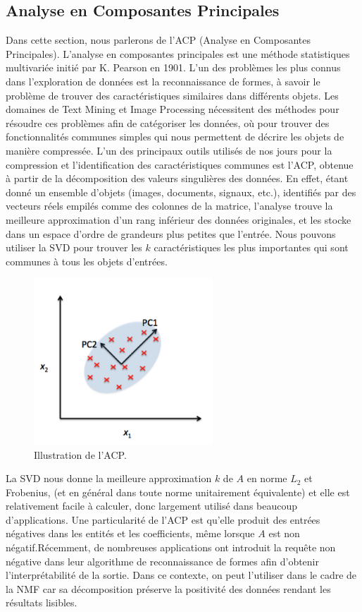 \documentclass[runningheads]{llncs}
\begin{document}
\subsection{Analyse en Composantes Principales}
Dans cette section, nous parlerons de l'ACP (Analyse en Composantes Principales). L'analyse en composantes principales est une méthode statistiques multivariée initié par K. Pearson en 1901. L'un des problèmes les plus connus dans l'exploration de données est la reconnaissance de formes, à savoir le problème de trouver des caractéristiques similaires dans différents objets. Les domaines de Text Mining et Image Processing nécessitent des méthodes pour résoudre ces problèmes afin de catégoriser les données, où pour trouver des fonctionnalités communes simples qui nous permettent de décrire les objets de manière compressée. L'un des principaux outils utilisés de nos jours pour la compression et l'identification des caractéristiques communes est l'ACP, obtenue à partir de la décomposition des valeurs singulières des données. En effet, étant donné un ensemble d'objets (images, documents, signaux, etc.), identifiés par des vecteurs réels empilés comme des colonnes de la matrice, l'analyse trouve la meilleure approximation d'un rang inférieur des données originales, et les stocke dans un espace d'ordre de grandeurs plus petites que l'entrée. Nous pouvons utiliser la SVD pour trouver les $k$ caractéristiques les plus importantes qui sont communes à tous les objets d'entrées.

\begin{figure}[H]
\centering
\includegraphics[width=0.6\textwidth]{pca.png}
\caption{Illustration de l'ACP.}
  \label{fig:k_means_not_spherical}
\end{figure}

La SVD nous donne la meilleure approximation $k$ de $A$ en norme $L_2$ et Frobenius, (et en général dans toute norme unitairement équivalente) et elle est relativement facile à calculer, donc largement utilisé dans beaucoup d'applications. Une particularité de l'ACP est qu'elle produit des entrées négatives dans les entités et les coefficients, même lorsque $A$ est non négatif.\newline Récemment, de nombreuses applications ont introduit la requête non négative dans leur algorithme \cite{nadif} de reconnaissance de formes afin d'obtenir l'interprétabilité de la sortie. Dans ce contexte, on peut l'utiliser dans le cadre de la NMF car sa décomposition préserve la positivité des données rendant les résultats lisibles.
\end{document}
